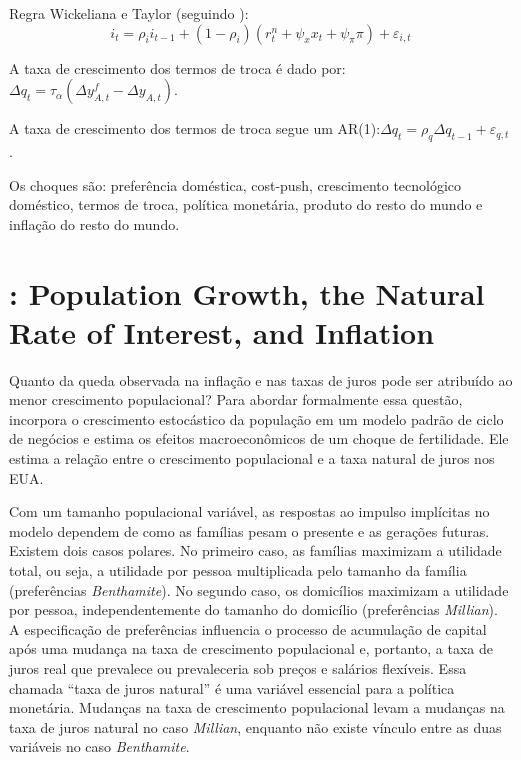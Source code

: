 Regra Wickeliana e Taylor (seguindo \citet{Curdia:2015}):
\begin{equation*}
    i_t = \rho_i i_{t-1} + (1 - \rho_i)(r_t^{n} + \psi_{x}x_t + \psi_{\pi} \pi) + \varepsilon_{i,t}
\end{equation*}

A taxa de crescimento dos termos de troca é dado por: $\Delta q_t = \tau_{\alpha}(\Delta y_{A,t}^{f} - \Delta y_{A,t})$.

A taxa de crescimento dos termos de troca segue um AR(1):$\Delta q_t = \rho_q \Delta q_{t-1} + \varepsilon_{q,t}$.

Os choques são: preferência doméstica, cost-push, crescimento tecnológico doméstico, termos de troca, política monetária, produto do resto do mundo e inflação do resto do mundo.
%
%
\section{\citet{Weiske:2019}: Population Growth, the Natural Rate of Interest, and Inflation  }

Quanto da queda observada na inflação e nas taxas de juros pode ser atribuído ao menor crescimento populacional? Para abordar formalmente essa questão, incorpora o crescimento estocástico da população em um modelo padrão de ciclo de negócios e estima os efeitos macroeconômicos de um choque de fertilidade. Ele estima a relação entre o crescimento populacional e a taxa natural de juros nos EUA.

Com um tamanho populacional variável, as respostas ao impulso implícitas no modelo dependem de como as famílias pesam o presente e as gerações futuras. Existem dois casos polares. No primeiro caso, as famílias maximizam a utilidade total, ou seja, a utilidade por pessoa multiplicada pelo tamanho da família (preferências \textit{Benthamite}). No segundo caso, os domicílios maximizam a utilidade por pessoa, independentemente do tamanho do domicílio (preferências \textit{Millian}). A especificação de preferências influencia o processo de acumulação de capital após uma mudança na taxa de crescimento populacional e, portanto, a taxa de juros real que prevalece ou prevaleceria sob preços e salários flexíveis. Essa chamada “taxa de juros natural” é uma variável essencial para a política monetária. Mudanças na taxa de crescimento populacional levam a mudanças na taxa de juros natural no caso \textit{Millian}, enquanto não existe vínculo entre as duas variáveis no caso \textit{Benthamite}.


